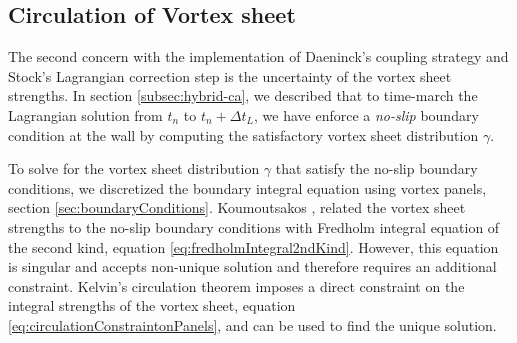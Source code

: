	\subsection{Circulation of Vortex sheet}
	\label{subsec:coupling-covs}
	
	The second concern with the implementation of Daeninck's coupling strategy and Stock's Lagrangian correction step is the uncertainty of the vortex sheet strengths. In section \ref{subsec:hybrid-ca}, we described that to time-march the Lagrangian solution from $t_n$ to $t_{n}+\Delta t_L$, we have enforce a \textit{no-slip} boundary condition at the wall by computing the satisfactory vortex sheet distribution $\gamma$. 
	
	To solve for the vortex sheet distribution $\gamma$ that satisfy the no-slip boundary conditions, we discretized the boundary integral equation using vortex panels, section \ref{sec:boundaryConditions}. Koumoutsakos \cite{Koumoutsakos1993b}, related the vortex sheet strengths to the no-slip boundary conditions with Fredholm integral equation of the second kind, equation \ref{eq:fredholmIntegral2ndKind}. However, this equation is singular and accepts non-unique solution and therefore requires an additional constraint. Kelvin's circulation theorem imposes a direct constraint on the integral strengths of the vortex sheet, equation \ref{eq:circulationConstraintonPanels}, and can be used to find the unique solution. 
	
